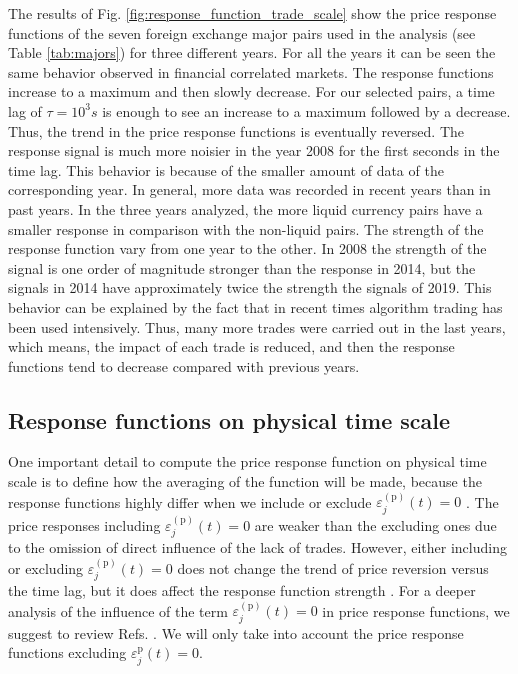The results of Fig. \ref{fig:response_function_trade_scale} show the
price response functions of the seven foreign exchange major pairs used in the
analysis (see Table \ref{tab:majors}) for three different years. For all the
years it can be seen the same behavior observed in financial correlated
markets. The response functions increase to a maximum and then slowly decrease.
For our selected pairs, a time lag of $\tau = 10^{3}s$ is enough to see an
increase to a maximum followed by a decrease. Thus, the trend in the price
response functions is eventually reversed. The response signal is much more
noisier in the year 2008 for the first seconds in the time lag. This behavior
is because of the smaller amount of data of the corresponding year. In general,
more data was recorded in recent years than in past years. In the three years
analyzed, the more liquid currency pairs have a smaller response in comparison
with the non-liquid pairs. The strength of the response function vary from one
year to the other. In 2008 the strength of the signal is one order of magnitude
stronger than the response in 2014, but the signals in 2014 have approximately
twice the strength the signals of 2019. This behavior can be explained by the
fact that in recent times algorithm trading has been used intensively. Thus,
many more trades were carried out in the last years, which means, the impact of
each trade is reduced, and then the response functions tend to decrease
compared with previous years.

\subsection{Response functions on physical time scale}
\label{subsec:response_function_physical}

One important detail to compute the price response function on physical time
scale is to define how the averaging of the function will be made, because the
response functions highly differ when we include or exclude
$\varepsilon^{\left(\textrm{p}\right)}_j \left( t\right) = 0$
\cite{Wang_2016_cross}. The price responses including
$\varepsilon^{\left(\textrm{p}\right)}_j \left( t\right) = 0$ are weaker than
the excluding ones due to the omission of direct influence of the lack of
trades. However, either including or excluding
$\varepsilon^{\left(\textrm{p}\right)}_j \left( t\right) = 0$ does not change
the trend of price reversion versus the time lag, but it does affect the
response function strength \cite{Wang_2016_avg}. For a deeper analysis of the
influence of the term
$\varepsilon^{\left(\textrm{p}\right)}_j \left( t\right) = 0$ in price response
functions, we suggest to review Refs. \cite{Wang_2016_avg,Wang_2016_cross}. We
will only take into account the price response functions excluding
$\varepsilon^{\textrm{p}}_j \left( t\right) = 0$.


